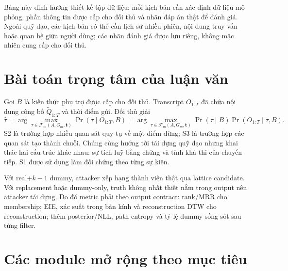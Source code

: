 \documentclass[12pt,a4paper,oneside]{report}
\begin{document}
Bảng này định hướng thiết kế tập dữ liệu: mỗi kịch bản cần xác định dữ liệu mô phỏng, phần thông tin được cấp cho đối thủ và nhãn đáp án thật để đánh giá. Ngoài quỹ đạo, các kịch bản có thể cần lịch sử nhiều phiên, nội dung truy vấn hoặc quan hệ giữa người dùng; các nhãn đánh giá được lưu riêng, không mặc nhiên cung cấp cho đối thủ.

\section{Bài toán trọng tâm của luận văn}

\begin{center}
\end{center}

Gọi $B$ là kiến thức phụ trợ được cấp cho đối thủ. Transcript $O_{1:T}$ đã chứa nội dung công bố $\widetilde Q_{1:T}$ và thời điểm gửi. Đối thủ giải
\[
\widehat{\tau}
=\arg\max_{\tau\in\mathcal F_m(A,G_m,\mathbf t)}
\Pr(\tau\mid O_{1:T},B)
=\arg\max_{\tau\in\mathcal F_m(A,G_m,\mathbf t)}
\Pr(\tau\mid B)\Pr(O_{1:T}\mid\tau,B).
\]
S2 là trường hợp nhiều quan sát quy tụ về một điểm dừng; S3 là trường hợp các quan sát tạo thành chuỗi. Chúng cùng hướng tới tái dựng quỹ đạo nhưng khai thác hai cấu trúc khác nhau: sự tích luỹ bằng chứng và tính khả thi của chuyển tiếp. S1 được sử dụng làm đối chứng theo từng sự kiện.

Với real+$k-1$ dummy, attacker xếp hạng thành viên thật qua lattice candidate. Với replacement hoặc dummy-only, truth không nhất thiết nằm trong output nên attacker tái dựng. Do đó metric phải theo output contract: rank/MRR cho membership; EIE, xác suất trong bán kính và reconstruction DTW cho reconstruction; thêm posterior/NLL, path entropy và tỷ lệ dummy sống sót sau từng filter.

\section{Các module mở rộng theo mục tiêu}
\end{document}
